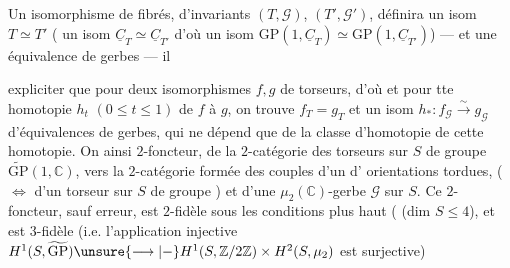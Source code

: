 Un isomorphisme de fibrés, d'invariants
$(T,\mathcal G)$, $(T',\mathcal G')$, définira un isom $T\simeq T'$
( un isom 
$\underline C_T\simeq\underline C_{T'}$ d'où
un isom $\mathrm{GP}(1,\underline C_T)\simeq\mathrm{GP}(1,\underline C_{T'})$) --- et
une équivalence de gerbes --- il 

expliciter que pour deux isomorphismes
$f,g$ de torseurs,  d'où
et pour tte homotopie $h_t$ $(0\leq t\leq1)$ de
$f$ à $g$, on trouve $f_T=g_T$ et un
isom $h_*:f_{\mathcal G}\xrightarrow{\sim}g_{\mathcal G}$ d'équivalences de
gerbes, qui ne dépend que de la classe
d'homotopie de cette homotopie. On
 ainsi  $2$-foncteur, de la
$2$-catégorie des  torseurs sur $S$
de groupe $\widetilde{\mathrm{GP}}(1,\mathbb C)$, vers la $2$-catégorie
formée des couples  d'un
  d'%
orientations tordues,  ($\Longleftrightarrow$ d'un torseur sur
$S$ de groupe  ) et d'une
 $\mu_2(\mathbb C)$-gerbe $\mathcal G$ sur $S$. Ce
$2$-foncteur, sauf erreur, est $2$-fidèle
sous les conditions  plus
haut ( (dim $S\leq4$), et
est $3$-fidèle (i.e. l'application injective
$H^1(S,\widetilde{\mathrm{GP}})\unsure{\longrightarrow|{-}}
H^1(S,\mathbb Z/2\mathbb Z)\times H^2(S,\mu_2)$ est surjective)


